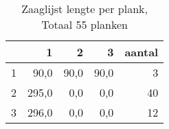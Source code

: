 \begin{table}[h!]
\centering
\caption{Zaaglijst lengte per plank, Totaal 55 planken}
\begin{tabular}{lrrrr}
\toprule
{} &     1 &    2 &    3 &  aantal \\
\midrule
1 &  90,0 & 90,0 & 90,0 &       3 \\
2 & 295,0 &  0,0 &  0,0 &      40 \\
3 & 296,0 &  0,0 &  0,0 &      12 \\
\bottomrule
\end{tabular}
\end{table}
